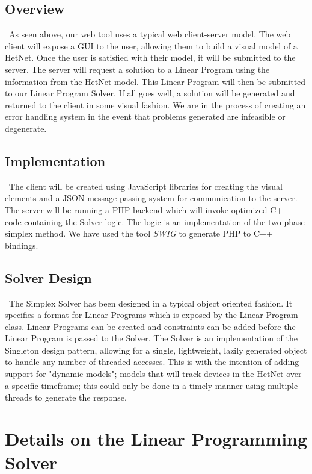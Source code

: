 \documentclass[11pt]{article}
\begin{document}
\subsection{Overview}
~\indent As seen above, our web tool uses a typical web client-server model. The web client
will expose a GUI to the user, allowing them to build a visual model of a 
HetNet. Once the user is satisfied with their model, it will be submitted to the 
server. The server will request a solution to a Linear Program using the information 
from the HetNet model. This Linear Program will then be submitted to our Linear
Program Solver. If all goes well, a solution will be generated and returned to 
the client in some visual fashion. We are in the process of creating an 
error handling system in the event that problems generated are infeasible or 
degenerate. 

\subsection{Implementation}
~\indent The client will be created using JavaScript libraries for creating the visual 
elements and a JSON message passing system for communication to the server.
The server will be running a PHP backend which will invoke optimized
C++ code containing the Solver logic. The logic is an implementation of the two-phase
simplex method. We have used the tool \textit{SWIG} to generate  %
PHP to C++ bindings. 

\subsection{Solver Design}
~\indent The Simplex Solver has been designed in a typical object oriented fashion. 
It specifies a format for Linear Programs which is exposed by the Linear Program
class. Linear Programs can be created and constraints can be added before 
the Linear Program is passed to the Solver. The Solver is an implementation of 
the Singleton design pattern, allowing for a single, lightweight, lazily generated 
object to handle any number of threaded accesses. This is with the intention of 
adding support for "dynamic models"; models that will track devices in the HetNet
over a specific timeframe; this could only be done in a timely manner using 
multiple threads to generate the response. 

\section{Details on the Linear Programming Solver}
\end{document}

